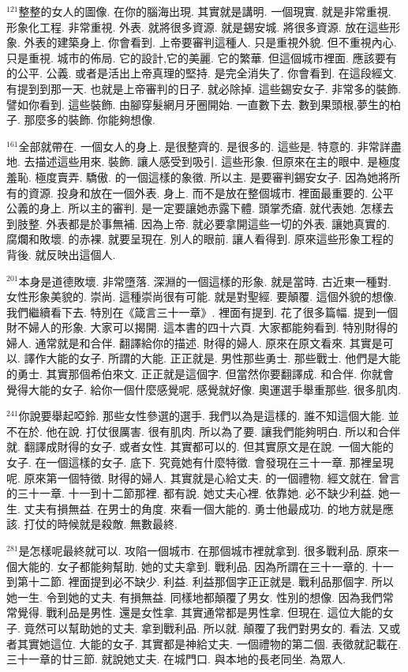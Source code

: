 \documentclass{book}
\begin{document}
$^{121}$整整的女人的圖像.
在你的腦海出現.
其實就是講明.
一個現實.
就是非常重視.
形象化工程.
非常重視.
外表.
就將很多資源.
就是錫安城.
將很多資源.
放在這些形象.
外表的建築身上.
你會看到.
上帝要審判這種人.
只是重視外貌.
但不重視內心.
只是重視.
城市的佈局.
它的設計,它的美麗.
它的繁華.
但這個城市裡面.
應該要有的公平.
公義.
或者是活出上帝真理的堅持.
是完全消失了.
你會看到.
在這段經文.
有提到到那一天.
也就是上帝審判的日子.
就必除掉.
這些錫安女子.
非常多的裝飾.
譬如你看到.
這些裝飾.
由腳穿髮網月牙圈開始.
一直數下去.
數到果頭根,夢生的柏子.
那麼多的裝飾.
你能夠想像.

$^{161}$全部就帶在.
一個女人的身上.
是很整齊的.
是很多的.
這些是.
特意的.
非常詳盡地.
去描述這些用來.
裝飾.
讓人感受到吸引.
這些形象.
但原來在主的眼中.
是極度羞恥.
極度賣弄.
驕傲.
的一個這樣的象徵.
所以主.
是要審判錫安女子.
因為她將所有的資源.
投身和放在一個外表.
身上.
而不是放在整個城市.
裡面最重要的.
公平公義的身上.
所以主的審判.
是一定要讓她赤露下體.
頭掌禿瘡.
就代表她.
怎樣去到肢整.
外表都是於事無補.
因為上帝.
就必要拿開這些一切的外表.
讓她真實的.
腐爛和敗壞.
的赤裸.
就要呈現在.
別人的眼前.
讓人看得到.
原來這些形象工程的背後.
就反映出這個人.

$^{201}$本身是道德敗壞.
非常墮落.
深淵的一個這樣的形象.
就是當時.
古近東一種對.
女性形象美貌的.
崇尚.
這種崇尚很有可能.
就是對聖經.
要顛覆.
這個外貌的想像.
我們繼續看下去.
特別在《箴言三十一章》.
裡面有提到.
花了很多篇幅.
提到一個財不婦人的形象.
大家可以揭開.
這本書的四十六頁.
大家都能夠看到.
特別財得的婦人.
通常就是和合伴.
翻譯給你的描述.
財得的婦人.
原來在原文看來.
其實是可以.
譯作大能的女子.
所謂的大能.
正正就是.
男性那些勇士.
那些戰士.
他們是大能的勇士.
其實那個希伯來文.
正正就是這個字.
但當然你要翻譯成.
和合伴.
你就會覺得大能的女子.
給你一個什麼感覺呢.
感覺就好像.
奧運選手舉重那些.
很多肌肉.

$^{241}$你說要舉起啞鈴.
那些女性參選的選手.
我們以為是這樣的.
誰不知這個大能.
並不在於.
他在說.
打仗很厲害.
很有肌肉.
所以為了要.
讓我們能夠明白.
所以和合伴就.
翻譯成財得的女子.
或者女性.
其實都可以的.
但其實原文是在說.
一個大能的女子.
在一個這樣的女子.
底下.
究竟她有什麼特徵.
會發現在三十一章.
那裡呈現呢.
原來第一個特徵.
財得的婦人.
其實就是心給丈夫.
的一個禮物.
經文就在.
曾言的三十一章.
十一到十二節那裡.
都有說.
她丈夫心裡.
依靠她.
必不缺少利益.
她一生.
丈夫有損無益.
在男士的角度.
來看一個大能的.
勇士他最成功.
的地方就是應該.
打仗的時候就是殺敵.
無數最終.

$^{281}$是怎樣呢最終就可以.
攻陷一個城市.
在那個城市裡就拿到.
很多戰利品.
原來一個大能的.
女子都能夠幫助.
她的丈夫拿到.
戰利品.
因為所謂在三十一章的.
十一到第十二節.
裡面提到必不缺少.
利益.
利益那個字正正就是.
戰利品那個字.
所以她一生.
令到她的丈夫.
有損無益.
同樣地都顛覆了男女.
性別的想像.
因為我們常常覺得.
戰利品是男性.
還是女性拿.
其實通常都是男性拿.
但現在.
這位大能的女子.
竟然可以幫助她的丈夫.
拿到戰利品.
所以就.
顛覆了我們對男女的.
看法.
又或者其實她這位.
大能的女子.
其實都是神給丈夫.
一個禮物的第二個.
表徵就記載在.
三十一章的廿三節.
就說她丈夫.
在城門口.
與本地的長老同坐.
為眾人.
\end{document}
